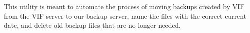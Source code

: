 This utility is meant to automate the process of moving backups created by V\-I\-F from the V\-I\-F server to our backup server, name the files with the correct current date, and delete old backup files that are no longer needed. 